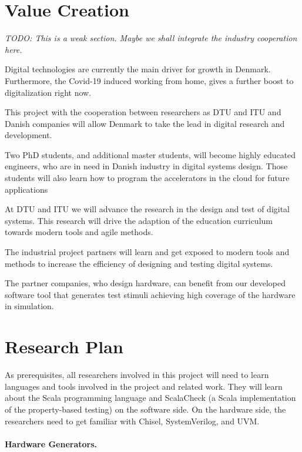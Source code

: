 \documentclass[fleqn,12pt]{article}
\newcommand{\todo}[1]{{\it TODO: #1}}
\begin{document}
\section{Value Creation}

\todo{This is a weak section. Maybe we shall integrate the industry cooperation here.}

Digital technologies are currently the main driver for growth in Denmark. Furthermore, the Covid-19 induced working from home, gives a further boost to digitalization right now.

This project with the cooperation between researchers as DTU and ITU and Danish companies will allow Denmark to take the lead in digital research and development.

Two PhD students, and additional master students, will become highly educated engineers, who are in need in Danish industry in digital systems design. Those students will also learn how to program the accelerators in the cloud for future applications 

At DTU and ITU we will advance the research in the design and test of digital systems. This research will drive the adaption of the education curriculum towards modern tools and agile methods.

The industrial project partners will learn and get exposed to modern tools and methods to increase the efficiency of designing and testing digital systems.

The partner companies, who design hardware, can benefit from our developed software tool that generates test stimuli achieving high coverage of the hardware in simulation.

\section{Research Plan}


As prerequisites, all researchers involved in this project will need to learn
languages and tools involved in the project and related work.
They will learn about the Scala programming language and ScalaCheck
(a Scala implementation of the property-based testing) on the software side.
On the hardware side,
the researchers need to get familiar with Chisel, SystemVerilog, and
UVM.


\paragraph{Hardware Generators.}
\end{document}
